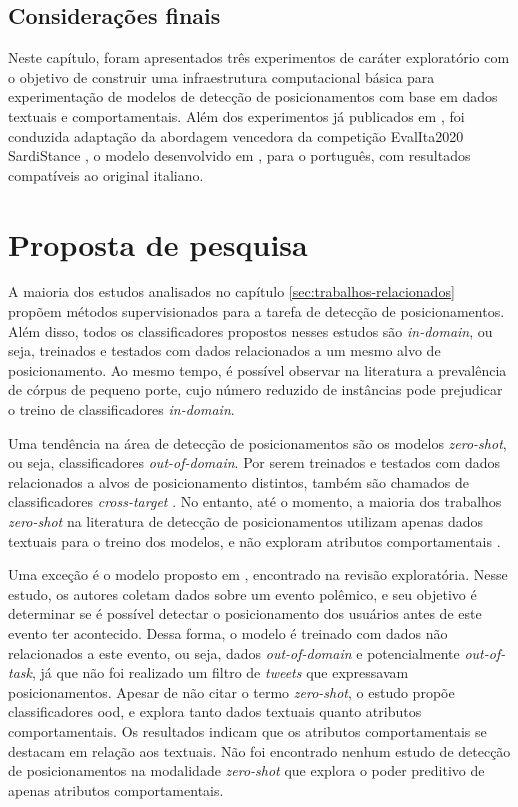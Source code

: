 \documentclass[
	12pt, oneside, a4paper, english, brazil
]{abntex2ppgsi}
\begin{document}
\section{Considerações finais}

Neste capítulo, foram apresentados três experimentos de caráter exploratório com o objetivo de construir uma infraestrutura computacional básica para experimentação de modelos de detecção de posicionamentos com base em dados textuais e comportamentais. Além dos experimentos já publicados em \cite{ranlp-lais}, foi conduzida adaptação da abordagem vencedora da competição EvalIta2020 SardiStance \cite{cignarella2020}, o modelo desenvolvido em , para o português, com resultados compatíveis ao original italiano.

\chapter{Proposta de pesquisa}
\label{sec:proposta}

A maioria dos estudos analisados no capítulo \ref{sec:trabalhos-relacionados} propõem métodos supervisionados para a tarefa de detecção de posicionamentos. Além disso, todos os classificadores propostos nesses estudos são {\em in-domain}, ou seja, treinados e testados com dados relacionados a um mesmo alvo de posicionamento. Ao mesmo tempo, é possível observar na literatura a prevalência de córpus de pequeno porte, cujo número reduzido de instâncias pode prejudicar o treino de classificadores {\em in-domain}. 

Uma tendência na área de detecção de posicionamentos são os modelos {\em zero-shot}, ou seja, classificadores {\em out-of-domain}. Por serem treinados e testados com dados relacionados a alvos de posicionamento distintos, também são chamados de classificadores {\em cross-target} \cite{condgen, pavan2022}. No entanto, até o momento, a maioria dos trabalhos {\em zero-shot} na literatura de detecção de posicionamentos utilizam apenas dados textuais para o treino dos modelos, e não exploram atributos comportamentais \cite{vast, toad, bicond, crossnet, ckenet}. 

Uma exceção é o modelo proposto em , encontrado na revisão exploratória. Nesse estudo, os autores coletam dados sobre um evento polêmico, e seu objetivo é determinar se é possível detectar o posicionamento dos usuários antes de este evento ter acontecido. Dessa forma, o modelo é treinado com dados não relacionados a este evento, ou seja, dados {\em out-of-domain} e potencialmente {\em out-of-task}, já que não foi realizado um filtro de {\em tweets} que expressavam posicionamentos. Apesar de não citar o termo {\em zero-shot}, o estudo propõe classificadores ood, e explora tanto dados textuais quanto atributos comportamentais. Os resultados indicam que os atributos comportamentais se destacam em relação aos textuais. Não foi encontrado nenhum estudo de detecção de posicionamentos na modalidade {\em zero-shot} que explora o poder preditivo de apenas atributos comportamentais.
\end{document}
